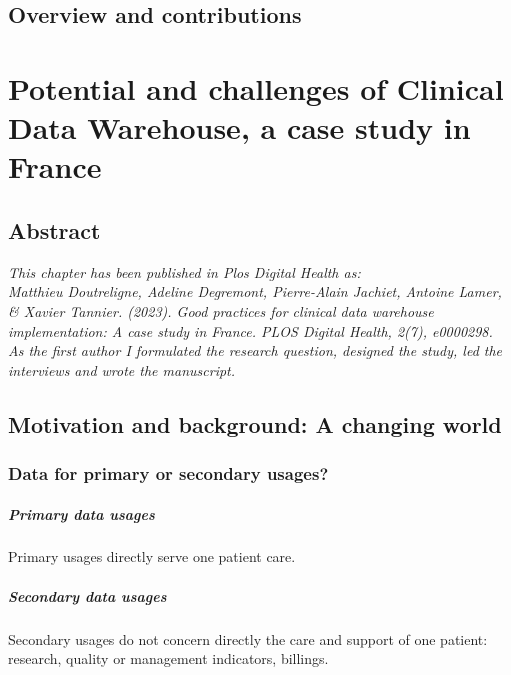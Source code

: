 \documentclass{report}
\begin{document}
\section{Overview and contributions}\label{sec:intro:contributions}



\chapter{Potential and challenges of Clinical Data Warehouse, a case study in France}\label{chapter:cdw}

\section{Abstract}\label{sec:cdw:abstract}


\vfill
\textit{This chapter has been published in Plos Digital Health as:\\
  Matthieu Doutreligne, Adeline Degremont, Pierre-Alain Jachiet, Antoine Lamer, \& Xavier Tannier. (2023).
  Good practices for clinical data warehouse implementation: A case study in
  France. PLOS Digital Health, 2(7), e0000298. \\
  As the first author I formulated the research question, designed the study,
  led the interviews and wrote the manuscript.}


\clearpage
\section{Motivation and background: A changing world}\label{sec:cdw:motivation}

\subsection{Data for primary or secondary
  usages?}\label{subsec:cdw:data_usages}

\paragraph{Primary data usages}
Primary usages directly serve one patient care.

\paragraph{Secondary data usages}
Secondary usages do not concern directly the care and support of one patient:
research, quality or management indicators, billings.
\end{document}

